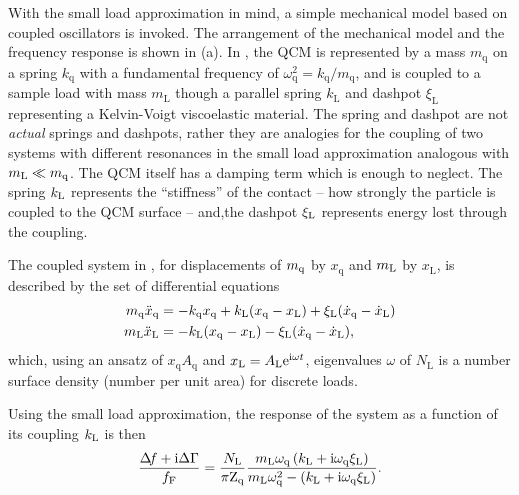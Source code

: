 With the small load approximation in mind, a simple mechanical model based
on coupled oscillators is invoked.  The arrangement of the mechanical model
and the frequency response is shown in (a).  In
, the QCM is represented by a mass
$m_\mathrm{q}$ on a spring $k_\mathrm{q}$ with a fundamental frequency of
$\omega_\mathrm{q}^2=k_\mathrm{q}/m_\mathrm{q}$, and is coupled to a sample
load with mass $m_\mathrm{L}$ though a parallel spring $k_\mathrm{L}$ and
dashpot $\xi_\mathrm{L}$ representing a Kelvin-Voigt viscoelastic material.
The spring and dashpot are not \textit{actual} springs and dashpots, rather
they are analogies for the coupling of two systems with different
resonances in the small load approximation analogous with $m_\mathrm{L}\ll m_\mathrm{q}$.  The
QCM itself has a damping term which is enough to neglect.  The spring $k_\mathrm{L}$
represents the ``stiffness'' of the contact -- how strongly the particle is
coupled to the QCM surface -- and,the dashpot $\xi_\mathrm{L}$ represents energy lost
through the coupling.

The coupled system in , for displacements of
$m_\mathrm{q}$ by $x_\mathrm{q}$ and $m_\mathrm{L}$ by $x_\mathrm{L}$, is described by the
set of differential equations
\begin{align}
 m_\mathrm{q} \ddot{x}_\mathrm{q} &= -k_\mathrm{q} x_\mathrm{q} +k_\mathrm{L} (x_\mathrm{q}-x_\mathrm{L}) + \xi_\mathrm{L} (\dot{x}_\mathrm{q}-\dot{x}_\mathrm{L})\\
 m_\mathrm{L} \ddot{x}_\mathrm{L} &= -k_\mathrm{L} (x_\mathrm{q}-x_\mathrm{L}) - \xi_\mathrm{L} (\dot{x}_\mathrm{q}-\dot{x}_\mathrm{L}),
\end{align}
which, using an ansatz of
$x_\mathrm{q}A_\mathrm{q}$ and $x_\mathrm{L}=A_\mathrm{L}{\mathrm{e}}^{{\mathrm{i}} \omega
t}$,
eigenvalues $\omega$ of
$N_\mathrm{L}$ is a number surface density (number per unit area) for discrete
loads.

Using the small load approximation, the response of the system
as a function of its coupling $k_\mathrm{L}$ is then
\begin{equation}
\frac{\Delta\!f + {\mathrm{i}} \Delta \Gamma}{f_\mathrm{F}} = \frac{N_\mathrm{L}}{\pi
\mathrm{Z}_\mathrm{q}}
\frac{m_\mathrm{L} \omega_\mathrm{q} \left( k_\mathrm{L} + {\mathrm{i}}
\omega_\mathrm{q} \xi_\mathrm{L}\right) }
{m_\mathrm{L} \omega_\mathrm{q}^2 - \left(k_\mathrm{L} + {\mathrm{i}}
\omega_\mathrm{q} \xi_\mathrm{L}\right)}.
\label{eqn:mastereq}
\end{equation}

